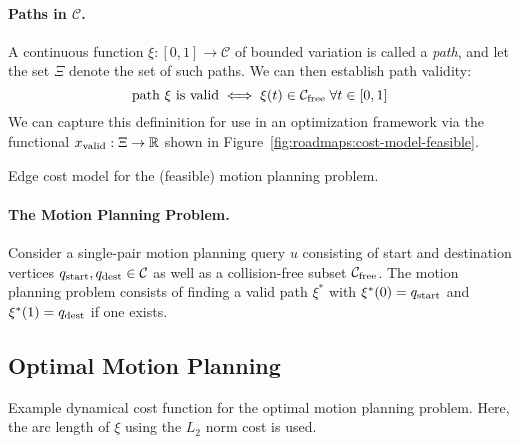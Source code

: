 \paragraph{Paths in $\mathcal{C}$.}
A continuous function $\xi : [0,1] \rightarrow \mathcal{C}$
of bounded variation is called a \emph{path},
and let the set $\Xi$ denote the set of such paths.
We can then establish path validity:
\begin{equation}
   \mbox{path $\xi$ is valid} \iff
   \xi(t) \in \mathcal{C}_{\mbox{\scriptsize free}} \;\forall t \in [0,1]
   \label{eqn:roadmaps:path-validity}
\end{equation}
We can capture this defininition for use in an optimization
framework via the functional
$x_{\mbox{\scriptsize valid}} : \Xi \rightarrow \mathbb{R}$
shown in Figure~\ref{fig:roadmaps:cost-model-feasible}.

\begin{marginfigure}
   \centering
   \caption{Edge cost model
      for the (feasible) motion planning problem.}
   \label{fig:roadmaps:cost-model-feasible}
\end{marginfigure}

\paragraph{The Motion Planning Problem.}
Consider a single-pair motion planning query $u$
consisting of start and destination vertices
$q_{\mbox{\scriptsize start}}, q_{\mbox{\scriptsize dest}} \in \mathcal{C}$
as well as a collision-free subset $\mathcal{C}_{\mbox{\scriptsize free}}$.
The motion planning problem consists of finding a valid path $\xi^*$
with $\xi^*(0) = q_{\mbox{\scriptsize start}}$ and $\xi^*(1) = q_{\mbox{\scriptsize dest}}$
if one exists.

\subsection{Optimal Motion Planning}

\begin{marginfigure}
   \centering
   \caption{Example dynamical cost function for the optimal
      motion planning problem.
      Here, the arc length of $\xi$ using the $L_2$ norm cost is used.}
   \label{fig:roadmaps:cost-model-path}
\end{marginfigure}

